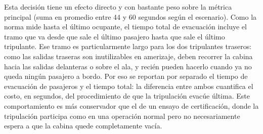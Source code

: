 \documentclass[a4paper, 11pt]{article}
\begin{document}
Esta decisi\'on tiene un efecto directo y con bastante peso sobre la m\'etrica
principal (suma en promedio entre 44 y 60 segundos seg\'un el escenario). Como la norma mide hasta el \'ultimo
ocupante, el tiempo total de evacuaci\'on incluye el tramo que va desde que sale el
\'ultimo pasajero hasta que sale el \'ultimo tripulante. Ese tramo es
particularmente largo para los dos tripulantes traseros: como las salidas traseras
son inutilizables en amerizaje, deben recorrer la cabina hacia las salidas
delanteras o sobre el ala, y reci\'en pueden hacerlo cuando ya no queda ning\'un
pasajero a bordo. Por eso se reportan por separado el tiempo de evacuaci\'on de
pasajeros y el tiempo total: la diferencia entre ambos cuantifica el costo, en
segundos, del procedimiento de que la tripulaci\'on evac\'ue \'ultima. Este
comportamiento es m\'as conservador que el de un ensayo de certificaci\'on, donde la
tripulaci\'on participa como en una operaci\'on normal pero no necesariamente espera
a que la cabina quede completamente vac\'ia.
\end{document}
